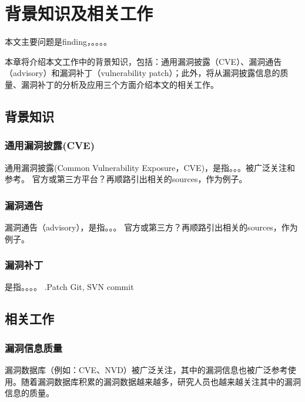 \chapter{背景知识及相关工作}

本文主要问题是finding，。。。。

本章将介绍本文工作中的背景知识，包括：通用漏洞披露（CVE）、漏洞通告（advisory）和漏洞补丁（vulnerability patch）；此外，将从漏洞披露信息的质量、漏洞补丁的分析及应用三个方面介绍本文的相关工作。


\section{背景知识}

\subsection{通用漏洞披露(CVE)} 
通用漏洞披露(Common Vulnerability Exposure，CVE)，是指。。。被广泛关注和参考。
官方或第三方平台？再顺路引出相关的sources，作为例子。


\subsection{漏洞通告} 
漏洞通告（advisory），是指。。。
官方或第三方？再顺路引出相关的sources，作为例子。

\subsection{漏洞补丁}
是指。。。。
.Patch
Git, SVN commit 



\section{相关工作}
\subsection{漏洞信息质量}
漏洞数据库（例如：CVE、NVD）被广泛关注，其中的漏洞信息也被广泛参考使用。随着漏洞数据库积累的漏洞数据越来越多，研究人员也越来越关注其中的漏洞信息的质量。

